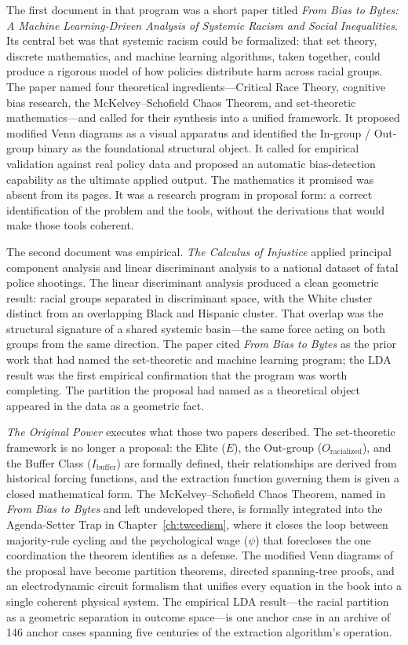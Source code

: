 \documentclass[12pt,openany]{book}
\numberwithin{equation}{chapter}
\begin{document}
The first document in that program was a short paper titled \textit{From Bias to Bytes: A Machine Learning-Driven Analysis of Systemic Racism and Social Inequalities}. Its central bet was that systemic racism could be formalized: that set theory, discrete mathematics, and machine learning algorithms, taken together, could produce a rigorous model of how policies distribute harm across racial groups. The paper named four theoretical ingredients---Critical Race Theory, cognitive bias research, the McKelvey--Schofield Chaos Theorem, and set-theoretic mathematics---and called for their synthesis into a unified framework. It proposed modified Venn diagrams as a visual apparatus and identified the In-group / Out-group binary as the foundational structural object. It called for empirical validation against real policy data and proposed an automatic bias-detection capability as the ultimate applied output. The mathematics it promised was absent from its pages. It was a research program in proposal form: a correct identification of the problem and the tools, without the derivations that would make those tools coherent.

The second document was empirical. \textit{The Calculus of Injustice} applied principal component analysis and linear discriminant analysis to a national dataset of fatal police shootings. The linear discriminant analysis produced a clean geometric result: racial groups separated in discriminant space, with the White cluster distinct from an overlapping Black and Hispanic cluster. That overlap was the structural signature of a shared systemic basin---the same force acting on both groups from the same direction. The paper cited \textit{From Bias to Bytes} as the prior work that had named the set-theoretic and machine learning program; the LDA result was the first empirical confirmation that the program was worth completing. The partition the proposal had named as a theoretical object appeared in the data as a geometric fact.

\textit{The Original Power} executes what those two papers described. The set-theoretic framework is no longer a proposal: the Elite ($E$), the Out-group ($O_{\text{racialized}}$), and the Buffer Class ($I_{\text{buffer}}$) are formally defined, their relationships are derived from historical forcing functions, and the extraction function governing them is given a closed mathematical form. The McKelvey--Schofield Chaos Theorem, named in \textit{From Bias to Bytes} and left undeveloped there, is formally integrated into the Agenda-Setter Trap in Chapter~\ref{ch:tweedism}, where it closes the loop between majority-rule cycling and the psychological wage ($\psi$) that forecloses the one coordination the theorem identifies as a defense. The modified Venn diagrams of the proposal have become partition theorems, directed spanning-tree proofs, and an electrodynamic circuit formalism that unifies every equation in the book into a single coherent physical system. The empirical LDA result---the racial partition as a geometric separation in outcome space---is one anchor case in an archive of 146 anchor cases spanning five centuries of the extraction algorithm's operation.
\end{document}
